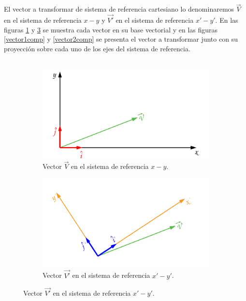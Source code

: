 \documentclass[12pt,letterpaper, twoside, openany]{article}
\begin{document}
%
%
El vector a transformar de sistema de referencia cartesiano lo denominaremos $\overset{\rightarrow}{V}$ en el sistema de referencia $x-y$ y $\overset{\rightarrow}{V'}$ en el sistema de referencia $x'-y'$. En las figuras \ref{vector1} y  \ref{vector2} se muestra cada vector en su base vectorial y en las  figuras \ref{vector1comp} y \ref{vector2comp} se presenta el vector a transformar junto con su proyección sobre cada uno de los ejes del sistema de referencia.\\\\
%
%
\begin{figure}[H]
	\centering
	\begin{subfigure}[l]{0.45\textwidth}
		\includegraphics[width=\textwidth]{img/Vector1.pdf}
		\caption{Vector $\overset{\rightarrow}{V}$ en el sistema de referencia $x-y$.}
		\label{vector1}
	\end{subfigure}
	\hspace{.5 cm}
	\begin{subfigure}[r]{0.45\textwidth}
		\includegraphics[width=\textwidth]{img/Vector2.pdf}
		\caption{Vector $\overset{\rightarrow}{V'}$ en el sistema de referencia $x'-y'$.}
		\label{vector2}
	\end{subfigure}
	\hspace{.5 cm}
%


\end{figure}
\end{document}
